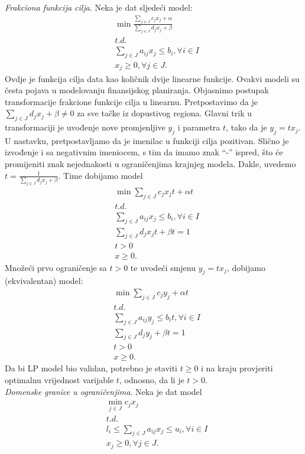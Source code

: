 \documentclass[a4paper, utf8, 11pt, colorlinks]{book}
\theoremstyle{definition}
\begin{document}
\emph{Frakciona funkcija cilja}. Neka je dat sljedeći model:
\begin{align*}
	& \min \frac{\sum_{j \in J} c_j x_j + \alpha}{ \sum_{j \in J} d_j x_j + \beta} \\
		& t.d. \nonumber \\
	& \sum_{j \in J} a_{ij} x_j \leq b_i,  \forall i \in I \\
	& x_j \geq 0, \forall j \in J.
\end{align*}
Ovdje je funkcija cilja data kao količnik dvije linearne funkcije. Ovakvi modeli su česta pojava u modelovanju finansijskog planiranja. Objasnimo postupak transformacije frakcione funkcije cilja u linearnu. Pretpostavimo da je $\sum_{j \in J}d_j x_j + \beta \neq 0$ za sve tačke iz dopustivog regiona. Glavni trik u transformaciji je uvođenje nove promjenljive $y_j$ i parametra $t$, tako da je $y_j = t x_j$. U nastavku, pretpostavljamo da je imenilac u funkciji cilja pozitivan. Slično je izvođenje i sa negativnim imeniocem, s tim da imamo znak ``-'' ispred, što će promijeniti znak nejednakosti u ograničenjima krajnjeg modela. Dakle, uvedemo $t = \frac{1}{\sum_{j \in J} d_j x_j + \beta }$. Time dobijamo model
\begin{align*}
	&\min \sum_{j \in J} c_j x_j t + \alpha t \\
	& t.d. \nonumber \\
	&\sum_{j \in J} a_{ij} x_j \leq b_i,  \forall i \in I \\
	& \sum_{j \in J} d_j x_j t + \beta t = 1 \\
	& t > 0 \\
	& x \geq 0.
\end{align*}
Množeći prvo ograničenje sa $t>0$ te uvodeći smjenu $y_j = t x_j$, dobijamo (ekvivalentan)  model:
\begin{align*}
	&\min \sum_{j \in J} c_j y_j + \alpha t \\
		& t.d. \nonumber \\
	& \sum_{j \in J} a_{ij} y_j \leq b_i t,  \forall i \in I \\
	& \sum_{j \in J} d_j y_j + \beta t = 1 \\
	& t > 0 \\
	& x \geq 0.
\end{align*}
Da bi LP model bio validan, potrebno je staviti $t \geq 0$ i na kraju provjeriti optimalnu vrijednost varijable $t$, odnosno, da li je $t>0$.   \\
\emph{Domenske granice u ograničenjima}. Neka je dat model
\begin{align*}
	&\min_{j \in J } c_j x_j \\
	& t.d. \nonumber \\
	& l_i \leq \sum_{j \in J} a_{ij} x_j \leq u_i, \forall i\in I \\
	& x_j \geq 0, \forall j \in J.
\end{align*} 
\end{document}
